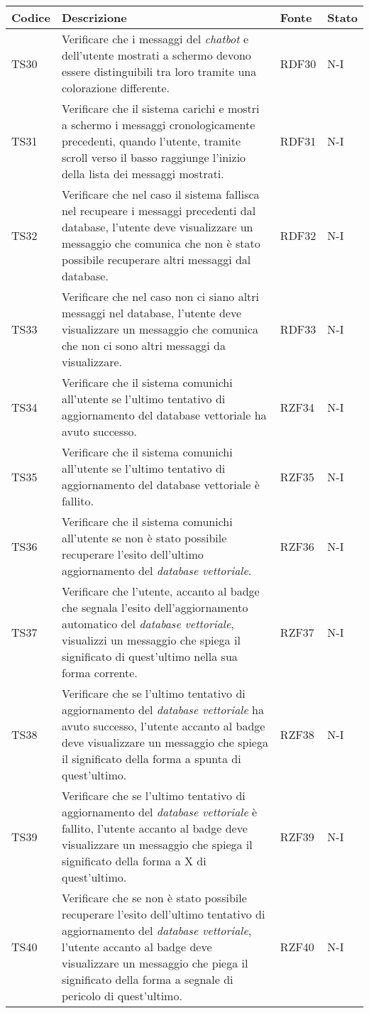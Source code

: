 \begin{table}[h!]
    \centering
    \renewcommand{\arraystretch}{1.5}
    \begin{tabularx}{\textwidth}{|p{}|X|p{}|p{}|}\hline
    \rowcolor[HTML]{FFD700}
    \textbf{Codice} & \textbf{Descrizione} & \textbf{Fonte} & \textbf{Stato} \\ \hline
    
    TS30 & Verificare che i messaggi del \emph{chatbot} e dell’utente mostrati a schermo devono essere distinguibili tra loro tramite una colorazione differente. & RDF30 & N-I \\ \hline
    TS31 & Verificare che il sistema carichi e mostri a schermo i messaggi cronologicamente precedenti, quando l’utente, tramite scroll verso il basso raggiunge l’inizio della lista dei messaggi mostrati. & RDF31 & N-I \\ \hline
    TS32 & Verificare che nel caso il sistema fallisca nel recupeare i messaggi precedenti dal database, l’utente deve visualizzare un messaggio che comunica che non è stato possibile recuperare altri messaggi dal database. & RDF32 & N-I \\ \hline
    TS33 & Verificare che nel caso non ci siano altri messaggi nel database, l’utente deve visualizzare un messaggio che comunica che non ci sono altri messaggi da visualizzare. & RDF33 & N-I \\ \hline
    TS34 & Verificare che il sistema comunichi all’utente se l’ultimo tentativo di aggiornamento del database vettoriale ha avuto successo. & RZF34 & N-I \\ \hline
    TS35 & Verificare che il sistema comunichi all’utente se l’ultimo tentativo di aggiornamento del database vettoriale è fallito. & RZF35 & N-I \\ \hline
    TS36 & Verificare che il sistema comunichi all’utente se non è stato possibile recuperare l’esito dell’ultimo aggiornamento del \emph{database vettoriale}. & RZF36 & N-I \\ \hline
    TS37 & Verificare che l’utente, accanto al badge che segnala l’esito dell’aggiornamento automatico del \emph{database vettoriale}, visualizzi un messaggio che spiega il significato di quest’ultimo nella sua forma corrente. & RZF37 & N-I \\ \hline
    TS38 & Verificare che se l’ultimo tentativo di aggiornamento del \emph{database vettoriale} ha avuto successo, l’utente accanto al badge deve visualizzare un messaggio che spiega il significato della forma a spunta di quest’ultimo. & RZF38 & N-I \\ \hline
    TS39 & Verificare che se l’ultimo tentativo di aggiornamento del \emph{database vettoriale} è fallito, l’utente accanto al badge deve visualizzare un messaggio che spiega il significato della forma a X di quest’ultimo. & RZF39 & N-I \\ \hline
    TS40 & Verificare che se non è stato possibile recuperare l’esito dell’ultimo tentativo di aggiornamento del \emph{database vettoriale}, l’utente accanto al badge deve visualizzare un messaggio che piega il significato della forma a segnale di pericolo di quest’ultimo. & RZF40 & N-I \\ \hline


\end{tabularx}
\end{table}

